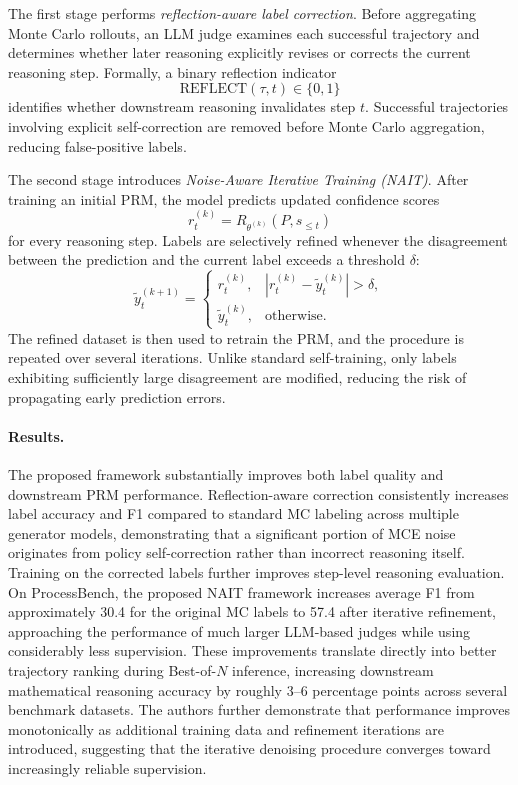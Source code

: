 \documentclass[11pt]{article}
\begin{document}
The first stage performs \emph{reflection-aware label correction}. Before aggregating Monte Carlo rollouts, an LLM judge examines each successful trajectory and determines whether later reasoning explicitly revises or corrects the current reasoning step. Formally, a binary reflection indicator
\[
\mathrm{REFLECT}(\tau,t)\in\{0,1\}
\]
identifies whether downstream reasoning invalidates step \(t\). Successful trajectories involving explicit self-correction are removed before Monte Carlo aggregation, reducing false-positive labels.

The second stage introduces \emph{Noise-Aware Iterative Training (NAIT)}. After training an initial PRM, the model predicts updated confidence scores
\[
r_t^{(k)}
=
R_{\theta^{(k)}}(P,s_{\le t})
\]
for every reasoning step. Labels are selectively refined whenever the disagreement between the prediction and the current label exceeds a threshold \(\delta\):
\[
\tilde y_t^{(k+1)}
=
\begin{cases}
r_t^{(k)}, &
|r_t^{(k)}-\tilde y_t^{(k)}|>\delta,\\
\tilde y_t^{(k)}, &
\text{otherwise.}
\end{cases}
\]
The refined dataset is then used to retrain the PRM, and the procedure is repeated over several iterations. Unlike standard self-training, only labels exhibiting sufficiently large disagreement are modified, reducing the risk of propagating early prediction errors.

\paragraph{Results.}
The proposed framework substantially improves both label quality and downstream PRM performance. Reflection-aware correction consistently increases label accuracy and F1 compared to standard MC labeling across multiple generator models, demonstrating that a significant portion of MCE noise originates from policy self-correction rather than incorrect reasoning itself.
Training on the corrected labels further improves step-level reasoning evaluation. On ProcessBench, the proposed NAIT framework increases average F1 from approximately 30.4 for the original MC labels to 57.4 after iterative refinement, approaching the performance of much larger LLM-based judges while using considerably less supervision. These improvements translate directly into better trajectory ranking during Best-of-\(N\) inference, increasing downstream mathematical reasoning accuracy by roughly 3--6 percentage points across several benchmark datasets. The authors further demonstrate that performance improves monotonically as additional training data and refinement iterations are introduced, suggesting that the iterative denoising procedure converges toward increasingly reliable supervision.
\end{document}
